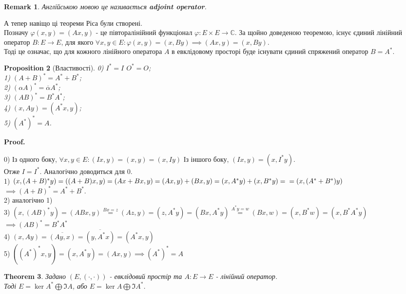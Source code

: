 \documentclass[a4paper, 10pt]{article}
\makeatletter
\theoremstyle{theoremdd}
\newtheorem{theorem}{Theorem}[subsection]
\newtheorem{proposition}[theorem]{Proposition}
\newtheorem{remark}[theorem]{Remark}
\renewenvironment{proof}[1][Proof.\\]{\par
\pushQED{\hfill \qed}%
\normalfont \topsep6\p@\@plus6\p@\relax
\trivlist
\item\relax
{\bfseries
#1\@addpunct{.}}\hspace\labelsep\ignorespaces
}{%
\popQED\endtrivlist\@endpefalse
}
\makeatother
\begin{document}
\begin{remark}
Англійською мовою це називається \textbf{adjoint operator}.
\end{remark}

А тепер навіщо ці теореми Ріса були створені.\\
Позначу $\varphi(x,y) = (Ax,y)$ - це півторалінійний функціонал $\varphi: E \times E \to \mathbb{C}$. За щойно доведеною теоремою, існує єдиний лінійний оператор $B: E \to E$, для якого $\forall x,y \in E: \varphi(x,y) = (x,By) \implies (Ax,y) = (x,By)$.\\
Тоді це означає, що для кожного лінійного оператора $A$ в евклідовому просторі буде існувати єдиний спряжений оператор $B = A^*$.

\begin{proposition}[Властивості]
0) $I^* = I$ \hspace{1cm} $O^* = O$;\\
1) $(A+B)^* = A^* + B^*$;\\
2) $(\alpha A)^* = \overline{\alpha} A^*$;\\
3) $(AB)^* = B^* A^*$;\\
4) $(x,Ay) = (A^*x,y)$;\\
5) $(A^*)^* = A$.
\end{proposition}

\begin{proof}
0) Із одного боку, $\forall x,y \in E: (Ix,y) = (x,y) = (x, Iy)$ Із іншого боку, $(Ix,y) = (x,I^*y)$.\\
Отже $I = I^*$. Аналогічно доводиться для $0$.
\bigskip \\
1) $(x,(A+B)^*y)=((A+B)x,y) = (Ax+Bx,y) = (Ax,y) + (Bx, y) = (x,A^* y)+(x,B^* y) = \\= (x,(A^*+B^*)y)$\\
$\implies (A+B)^* = A^* + B^*$.\\
2) аналогічно 1)
\bigskip \\
3) $(x,(AB)^*y)=(ABx, y) \overset{Bx = z}{=} (Az,y) = (z, A^*y) = (Bx, A^*y) \overset{A^* y = w}{=} (Bx,w) = (x, B^* w) = (x, B^* A^* y)$\\
$\implies (AB)^* = B^* A^*$
\bigskip \\
4) $(x,Ay) = \overline{(Ay, x)} = \overline{(y, A^*x)} = (A^*x, y)$
\bigskip \\
5) $((A^*)^*x,y)=(x,A^*y) = (Ax,y) 
\implies (A^*)^* = A$
\end{proof}

\begin{theorem}
\label{euclid_decomposition}
Задано $(E,(\cdot,\cdot))$ - евклідовий простір та $A: E \to E$ - лінійний оператор.\\
Тоді $E = \ker A^* \bigoplus \Im A$, \hspace{2cm} або $E = \ker A \bigoplus \Im A^*$.
\end{theorem}
\end{document}
